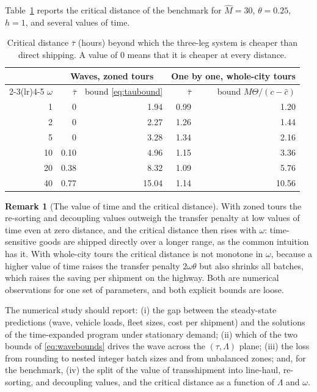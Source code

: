 \documentclass[10pt, reqno]{amsart}
\theoremstyle{definition}
\newtheorem{remark}{Remark}
\begin{document}
Table~\ref{tab:illustration} reports the critical distance of the benchmark for $\hat M=30$, $\theta=0.25$, $h=1$, and several values of time.

\begin{table}[h]
\centering
\caption{Critical distance $\bar\tau$ (hours) beyond which the three-leg system is cheaper than direct shipping. A value of $0$ means that it is cheaper at every distance.}\label{tab:illustration}
\begin{tabular}{rrrrr}
\toprule
 & \multicolumn{2}{c}{Waves, zoned tours} & \multicolumn{2}{c}{One by one, whole-city tours}\\
\cmidrule(lr){2-3}\cmidrule(lr){4-5}
$\omega$ & $\bar\tau$ & bound \eqref{eq:taubound} & $\bar\tau$ & bound $M\Theta/(c-\hat c)$\\
\midrule
1 & 0 & 1.94 & 0.99 & 1.20\\
2 & 0 & 2.27 & 1.26 & 1.44\\
5 & 0 & 3.28 & 1.34 & 2.16\\
10 & 0.10 & 4.96 & 1.15 & 3.36\\
20 & 0.38 & 8.32 & 1.09 & 5.76\\
40 & 0.77 & 15.04 & 1.14 & 10.56\\
\bottomrule
\end{tabular}
\end{table}

\begin{remark}[The value of time and the critical distance]\label{rem:omega}
With zoned tours the re-sorting and decoupling values outweigh the transfer penalty at low values of time even at zero distance, and the critical distance then rises with $\omega$: time-sensitive goods are shipped directly over a longer range, as the common intuition has it. With whole-city tours the critical distance is not monotone in $\omega$, because a higher value of time raises the transfer penalty $2\omega\theta$ but also shrinks all batches, which raises the saving per shipment on the highway. Both are numerical observations for one set of parameters, and both explicit bounds are loose.
\end{remark}

The numerical study should report: (i) the gap between the steady-state predictions (wave, vehicle loads, fleet sizes, cost per shipment) and the solutions of the time-expanded program under stationary demand; (ii) which of the two bounds of \eqref{eq:wavebounds} drives the wave across the $(\tau,\Lambda)$ plane; (iii) the loss from rounding to nested integer batch sizes and from unbalanced zones; and, for the benchmark, (iv) the split of the value of transshipment into line-haul, re-sorting, and decoupling values, and the critical distance as a function of $\Lambda$ and $\omega$.
\end{document}
